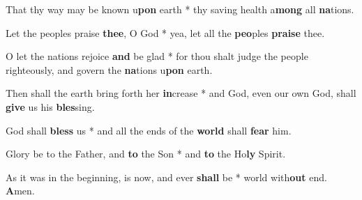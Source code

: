 \begin{multicols}{2}
	That thy way may be known u\textbf{pon} earth * thy saving health a\textbf{mong} all \textbf{na}tions.
	
	Let the peoples praise \textbf{thee}, O God * yea, let all the \textbf{peo}ples \textbf{praise} thee.
	
	O let the nations rejoice \textbf{and} be glad * for thou shalt judge the people righteously, and govern the \textbf{na}tions u\textbf{pon} earth.
	
	Then shall the earth bring forth her \textbf{in}crease * and God, even our own God, shall \textbf{give} us his \textbf{bles}sing.
	
	God shall \textbf{bless} us * and all the ends of the \textbf{world} shall \textbf{fear} him.
	
	Glory be to the Father, and \textbf{to} the Son * and \textbf{to} the Ho\textbf{ly} Spirit.
	
	As it was in the beginning, is now, and ever \textbf{shall} be * world with\textbf{out} end. \textbf{A}men.
\end{multicols}